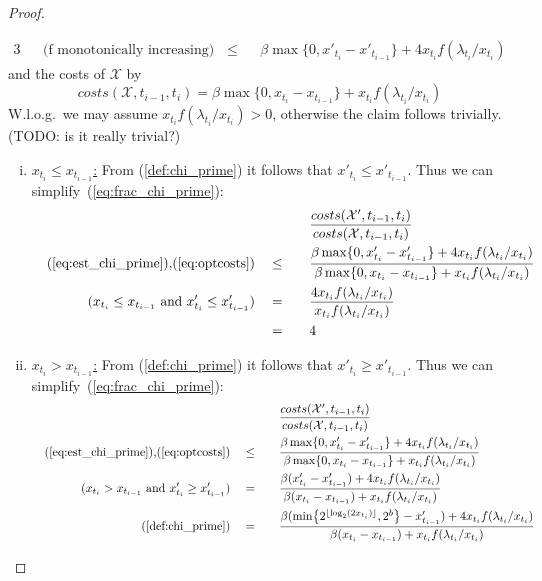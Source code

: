 \documentclass[hidelinks]{article}
\theoremstyle{plain}
\theoremstyle{definition}
\theoremstyle{rem}
\newcommand{\mx}{\mathcal{X}}
\begin{document}
\begin{sloppypar}
\begin{proof}
\begin{enumerate}
\begin{alignat}{3}
		&&\text{(f monotonically increasing)}\quad&\le&&\beta\max\{0,x'_{t_i}-x'_{t_{i-1}}\}+4x_{t_i}f(\lambda_{t_i}/x_{t_i})\label{eq:est_chi_prime}
	\end{alignat}
	and the costs of $\mx$ by
	\begin{equation}
		costs(\mx,t_{i-1},t_i)=\beta\max\{0,x_{t_i}-x_{t_{i-1}}\}+x_{t_i}f(\lambda_{t_i}/x_{t_i})\label{eq:optcosts}
	\end{equation}
	W.l.o.g.\ we may assume $x_{t_i}f(\lambda_{t_i}/x_{t_i})>0$, otherwise the claim follows trivially. (TODO: is it really trivial?)
	\begin{enumerate}[(i)]
		\item \underline{$x_{t_i}\le x_{t_{i-1}}$:}
			From (\ref{def:chi_prime}) it follows that $x'_{t_i}\le x'_{t_{i-1}}$. Thus we can simplify~(\ref{eq:frac_chi_prime}):
		\begin{alignat*}{3}
			&&&&&\frac{costs(\mx',t_{i-1},t_i)}{costs(\mx,t_{i-1},t_i)}\\
			&&\text{(\ref{eq:est_chi_prime}),(\ref{eq:optcosts})}\quad&\le\quad&&\frac{\beta\max\{0,x'_{t_i}-x'_{t_{i-1}}\}+4x_{t_i}f(\lambda_{t_i}/x_{t_i})}{\beta\max\{0,x_{t_i}-x_{t_{i-1}}\}+x_{t_i}f(\lambda_{t_i}/x_{t_i})}\\
			&&\text{($x_{t_i}\le x_{t_{i-1}}$ and $x'_{t_i}\le x'_{t_{i-1}}$)}\quad&=&&\frac{4x_{t_i}f(\lambda_{t_i}/x_{t_i})}{x_{t_i}f(\lambda_{t_i}/x_{t_i})}\\
			&&&=&&4
		\end{alignat*}
		\item \underline{$x_{t_i}>x_{t_{i-1}}$:}
		From (\ref{def:chi_prime}) it follows that $x'_{t_i}\ge x'_{t_{i-1}}$. Thus we can simplify~(\ref{eq:frac_chi_prime}):
		\begin{alignat*}{3}
			&&&&&\frac{costs(\mx',t_{i-1},t_i)}{costs(\mx,t_{i-1},t_i)}\\
			&&\text{(\ref{eq:est_chi_prime}),(\ref{eq:optcosts})}\quad&\le\quad&&\frac{\beta\max\{0,x'_{t_i}-x'_{t_{i-1}}\}+4x_{t_i}f(\lambda_{t_i}/x_{t_i})}{\beta\max\{0,x_{t_i}-x_{t_{i-1}}\}+x_{t_i}f(\lambda_{t_i}/x_{t_i})}\\
			&&\text{($x_{t_i}>x_{t_{i-1}}$ and $x'_{t_i}\ge x'_{t_{i-1}}$)}\quad&=&&\frac{\beta(x'_{t_i}-x'_{t_{i-1}})+4x_{t_i}f(\lambda_{t_i}/x_{t_i})}{\beta(x_{t_i}-x_{t_{i-1}})+x_{t_i}f(\lambda_{t_i}/x_{t_i})}\\
			&&\text{(\ref{def:chi_prime})}\quad&=&&\frac{\beta(\min\bigl\{2^{\lfloor \log_2(2x_{t_i})\rfloor},2^b\bigr\}-x'_{t_{i-1}})+4x_{t_i}f(\lambda_{t_i}/x_{t_i})}{\beta(x_{t_i}-x_{t_{i-1}})+x_{t_i}f(\lambda_{t_i}/x_{t_i})}\\

\end{alignat*}
\end{enumerate}
\end{enumerate}
\end{proof}
\end{sloppypar}
\end{document}
